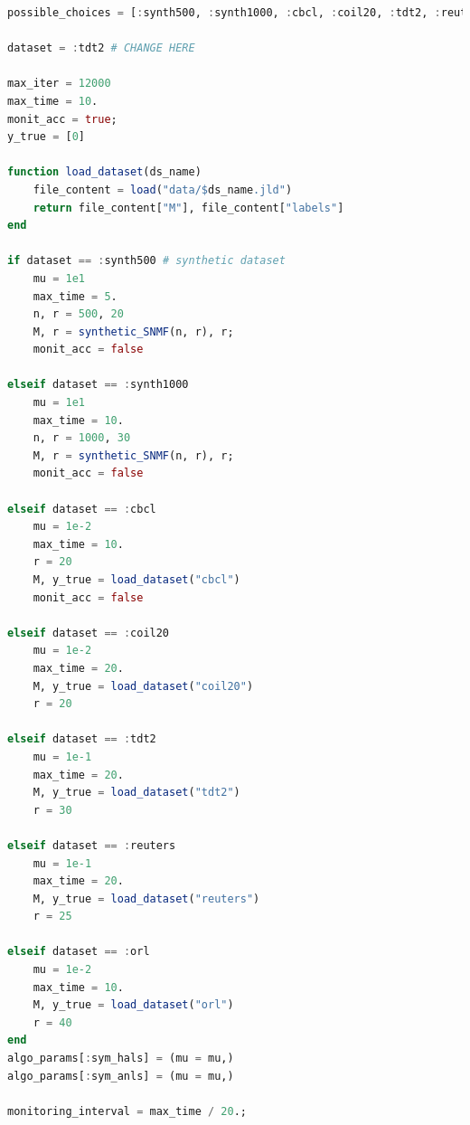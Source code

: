 \documentclass[a4paper,11pt]{article}
\begin{document}
\begin{lstlisting}[language=Julia, caption={Загрузка данных}, label={lst:example2}]
possible_choices = [:synth500, :synth1000, :cbcl, :coil20, :tdt2, :reuters]

dataset = :tdt2 # CHANGE HERE

max_iter = 12000
max_time = 10.
monit_acc = true;
y_true = [0]

function load_dataset(ds_name)
    file_content = load("data/$ds_name.jld")
    return file_content["M"], file_content["labels"]
end

if dataset == :synth500 # synthetic dataset
    mu = 1e1
    max_time = 5.
    n, r = 500, 20
    M, r = synthetic_SNMF(n, r), r;
    monit_acc = false

elseif dataset == :synth1000
    mu = 1e1
    max_time = 10.
    n, r = 1000, 30
    M, r = synthetic_SNMF(n, r), r;
    monit_acc = false

elseif dataset == :cbcl
    mu = 1e-2
    max_time = 10.
    r = 20
    M, y_true = load_dataset("cbcl")
    monit_acc = false

elseif dataset == :coil20
    mu = 1e-2
    max_time = 20.
    M, y_true = load_dataset("coil20")
    r = 20

elseif dataset == :tdt2
    mu = 1e-1
    max_time = 20.
    M, y_true = load_dataset("tdt2")
    r = 30

elseif dataset == :reuters
    mu = 1e-1
    max_time = 20.
    M, y_true = load_dataset("reuters")
    r = 25

elseif dataset == :orl
    mu = 1e-2
    max_time = 10.
    M, y_true = load_dataset("orl")
    r = 40
end
algo_params[:sym_hals] = (mu = mu,)
algo_params[:sym_anls] = (mu = mu,)

monitoring_interval = max_time / 20.;
\end{lstlisting}
\end{document}
